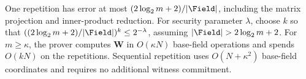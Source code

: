 One repetition has error at most \((2\log_2m+2)/|\Field|\),
including the matrix projection and inner-product reduction.
For security parameter \(\lambda\), choose \(k\) so that
\(((2\log_2m+2)/|\Field|)^k\leq2^{-\lambda}\), assuming
\(|\Field|>2\log_2m+2\).
For \(m\geq\kappa\), the prover computes \(\bm W\) in
\(O(\kappa N)\) base-field operations and spends \(O(kN)\) on the
repetitions.
Sequential repetition uses \(O(N+\kappa^2)\) base-field coordinates
and requires no additional witness commitment.
